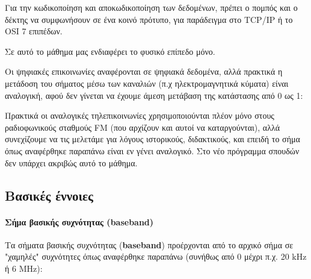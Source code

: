 \documentclass[11pt,a4paper,notitlepage,fleqn,final]{article}
\begin{document}
Για την κωδικοποίηση και αποκωδικοποίηση των δεδομένων, πρέπει ο πομπός και ο δέκτης να
συμφωνήσουν σε ένα κοινό πρότυπο, για παράδειγμα στο TCP/IP ή το OSI 7 επιπέδων.

Σε αυτό το μάθημα μας ενδιαφέρει το φυσικό επίπεδο μόνο.

Οι ψηφιακές επικοινωνίες αναφέρονται σε ψηφιακά δεδομένα, αλλά πρακτικά η μετάδοση
του σήματος μέσω των καναλιών (π.χ ηλεκτρομαγνητικά κύματα) είναι αναλογική, αφού δεν γίνεται
να έχουμε άμεση μετάβαση της κατάστασης από 0 ως 1:


Πρακτικά οι αναλογικές τηλεπικοινωνίες χρησιμοποιούνται πλέον μόνο στους ραδιοφωνικούς
σταθμούς FM (που αρχίζουν και αυτοί να καταργούνται), αλλά συνεχίζουμε να τις μελετάμε για
λόγους ιστορικούς, διδακτικούς, και επειδή το σήμα όπως αναφέρθηκε παραπάνω είναι εν γένει
αναλογικό. Στο νέο πρόγραμμα σπουδών δεν υπάρχει ακριβώς αυτό το μάθημα.

\subsection{Βασικές έννοιες}
\paragraph{Σήμα βασικής συχνότητας (baseband)}
Τα σήματα βασικής συχνότητας (\textbf{baseband}) προέρχονται από το αρχικό σήμα σε
"χαμηλές" συχνότητες όπως αναφέρθηκε παραπάνω (συνήθως από 0 μέχρι π.χ. 20 \( \mathrm{kHz} \)
ή 6 \( \mathrm{MHz} \)):

\end{document}

